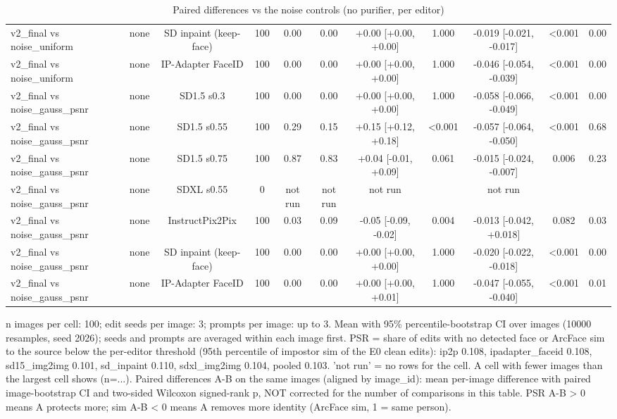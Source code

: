 \begin{table}[t]
{\begin{tabular}{lcccccccccc}
v2\_final vs noise\_uniform & none & SD inpaint (keep-face) & 100 & 0.00 & 0.00 & +0.00 [+0.00, +0.00] & 1.000 & -0.019 [-0.021, -0.017] & <0.001 & 0.00 \\
v2\_final vs noise\_uniform & none & IP-Adapter FaceID & 100 & 0.00 & 0.00 & +0.00 [+0.00, +0.00] & 1.000 & -0.046 [-0.054, -0.039] & <0.001 & 0.00 \\
v2\_final vs noise\_gauss\_psnr & none & SD1.5 s0.3 & 100 & 0.00 & 0.00 & +0.00 [+0.00, +0.00] & 1.000 & -0.058 [-0.066, -0.049] & <0.001 & 0.00 \\
v2\_final vs noise\_gauss\_psnr & none & SD1.5 s0.55 & 100 & 0.29 & 0.15 & +0.15 [+0.12, +0.18] & <0.001 & -0.057 [-0.064, -0.050] & <0.001 & 0.68 \\
v2\_final vs noise\_gauss\_psnr & none & SD1.5 s0.75 & 100 & 0.87 & 0.83 & +0.04 [-0.01, +0.09] & 0.061 & -0.015 [-0.024, -0.007] & 0.006 & 0.23 \\
v2\_final vs noise\_gauss\_psnr & none & SDXL s0.55 & 0 & not run & not run & not run &  & not run &  &  \\
v2\_final vs noise\_gauss\_psnr & none & InstructPix2Pix & 100 & 0.03 & 0.09 & -0.05 [-0.09, -0.02] & 0.004 & -0.013 [-0.042, +0.018] & 0.082 & 0.03 \\
v2\_final vs noise\_gauss\_psnr & none & SD inpaint (keep-face) & 100 & 0.00 & 0.00 & +0.00 [+0.00, +0.00] & 1.000 & -0.020 [-0.022, -0.018] & <0.001 & 0.00 \\
v2\_final vs noise\_gauss\_psnr & none & IP-Adapter FaceID & 100 & 0.00 & 0.00 & +0.00 [+0.00, +0.01] & 1.000 & -0.047 [-0.055, -0.040] & <0.001 & 0.01 \\
\bottomrule
\end{tabular}
}
\caption{Paired differences vs the noise controls (no purifier, per editor)}
\label{tab:paired_vs_noise}
\par\footnotesize n images per cell: 100; edit seeds per image: 3; prompts per image: up to 3. Mean with 95\% percentile-bootstrap CI over images (10000 resamples, seed 2026); seeds and prompts are averaged within each image first. PSR = share of edits with no detected face or ArcFace sim to the source below the per-editor threshold (95th percentile of impostor sim of the E0 clean edits): ip2p 0.108, ipadapter\_faceid 0.108, sd15\_img2img 0.101, sd\_inpaint 0.110, sdxl\_img2img 0.104, pooled 0.103. 'not run' = no rows for the cell. A cell with fewer images than the largest cell shows (n=...). Paired differences A-B on the same images (aligned by image\_id): mean per-image difference with paired image-bootstrap CI and two-sided Wilcoxon signed-rank p, NOT corrected for the number of comparisons in this table. PSR A-B > 0 means A protects more; sim A-B < 0 means A removes more identity (ArcFace sim, 1 = same person).
\end{table}
